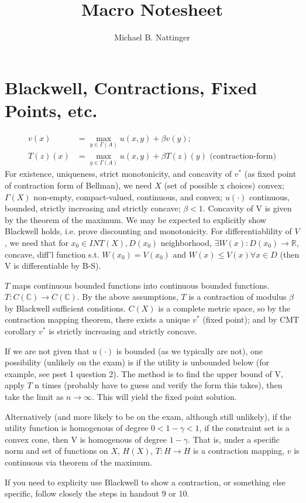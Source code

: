 \documentclass[11pt]{article} %
\title{Macro Notesheet}
\author{Michael B. Nattinger}
\begin{document}
\maketitle
\section{Blackwell, Contractions, Fixed Points, etc.}
\begin{align*}
v(x) &= \max_{y\in\Gamma(A)} u(x,y) + \beta v(y); \\
T(z)(x) &= \max_{y\in\Gamma(A)} u(x,y) + \beta T(z)(y) \text{ (contraction-form)}
\end{align*}
For existence, uniqueness, strict monotonicity, and concavity of $v^{*}$ (as fixed point of contraction form of Bellman), we need $X$ (set of possible x choices) convex; $\Gamma(X)$ non-empty, compact-valued, continuous, and convex; $u(\cdot)$ continuous, bounded, strictly increasing and strictly concave; $\beta<1$. Concavity of V is given by the theorem of the maximum. We may be expected to explicitly show Blackwell holds, i.e. prove discounting and monotonicity.
 For differentiablility of $V$, we need that for $x_0 \in INT(X), D(x_0)$ neighborhood, $\exists W(x):D(x_0) \rightarrow \mathbb{R}$, concave, diff'l function s.t. $W(x_0) = V(x_0)$ and $W(x) \leq V(x) \forall x \in D$ (then V is differentiable by B-S).

$T$ maps continuous bounded functions into continuous bounded functions. $T: C(\mathbb{C})\rightarrow C(\mathbb{C})$. By the above assumptions, $T$ is a contraction of modulus $\beta$ by Blackwell sufficient conditions. $C(X)$ is a complete metric space, so by the contraction mapping theorem, there exists a unique $v^{*}$ (fixed point); and by CMT corollary $v^{*}$ is strictly increasing and strictly concave.
 
If we are not given that $u(\cdot)$ is bounded (as we typically are not), one possibility (unlikely on the exam) is if the utility is unbounded below (for example, see pset 1 question 2). The method is to find the upper bound of V, apply $T$ n times (probably have to guess and verify the form this takes), then take the limit as $n\rightarrow \infty.$ This will yield the fixed point solution.

Alternatively (and more likely to be on the exam, although still unlikely), if the utility function is homogenous of degree $0<1-\gamma<1$, if the constraint set is a convex cone, then V is homogenous of degree $1-\gamma$. That is, under a specific norm and set of functions on $X$, $H(X)$, $T:H\rightarrow H$ is a contraction mapping, $v$ is continuous via theorem of the maximum. 

If you need to explicity use Blackwell to show a contraction, or something else specific, follow closely the steps in handout 9 or 10.
\end{document}
